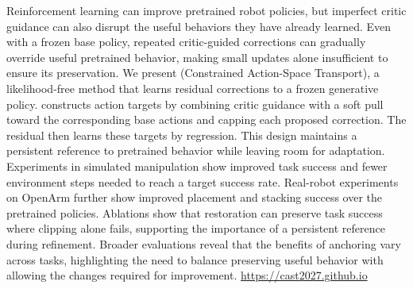 Reinforcement learning can improve pretrained robot policies, but imperfect critic guidance can also disrupt the useful behaviors they have already learned. 
Even with a frozen base policy, repeated critic-guided corrections can gradually override useful pretrained behavior, making small updates alone insufficient to ensure its preservation. 
We present \method{} (Constrained Action-Space Transport), a likelihood-free method that learns residual corrections to a frozen generative policy. 
\method{} constructs action targets by combining critic guidance with a soft pull toward the corresponding base actions and capping each proposed correction. 
The residual then learns these targets by regression. 
This design maintains a persistent reference to pretrained behavior while leaving room for adaptation. 
Experiments in simulated manipulation show improved task success and fewer environment steps needed to reach a target success rate. 
Real-robot experiments on OpenArm further show improved placement and stacking success over the pretrained policies. 
Ablations show that restoration can preserve task success where clipping alone fails, supporting the importance of a persistent reference during refinement. 
Broader evaluations reveal that the benefits of anchoring vary across tasks, highlighting the need to balance preserving useful behavior with allowing the changes required for improvement. \url{https://cast2027.github.io}


